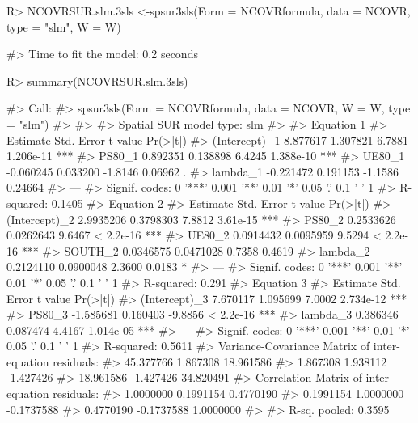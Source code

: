 \documentclass[article]{jss}
\begin{document}
\begin{CodeChunk}

\begin{CodeInput}
R> NCOVRSUR.slm.3sls <-spsur3sls(Form = NCOVRformula, data = NCOVR, type = "slm", W = W)
\end{CodeInput}

\begin{CodeOutput}
#> Time to fit the model:  0.2  seconds
\end{CodeOutput}

\begin{CodeInput}
R> summary(NCOVRSUR.slm.3sls)
\end{CodeInput}

\begin{CodeOutput}
#> Call:
#> spsur3sls(Form = NCOVRformula, data = NCOVR, W = W, type = "slm")
#> 
#>  
#> Spatial SUR model type:  slm 
#> 
#> Equation  1 
#>                Estimate Std. Error t value  Pr(>|t|)    
#> (Intercept)_1  8.877617   1.307821  6.7881 1.206e-11 ***
#> PS80_1         0.892351   0.138898  6.4245 1.388e-10 ***
#> UE80_1        -0.060245   0.033200 -1.8146   0.06962 .  
#> lambda_1      -0.221472   0.191153 -1.1586   0.24664    
#> ---
#> Signif. codes:  0 '***' 0.001 '**' 0.01 '*' 0.05 '.' 0.1 ' ' 1
#> R-squared: 0.1405 
#>   Equation  2 
#>                Estimate Std. Error t value  Pr(>|t|)    
#> (Intercept)_2 2.9935206  0.3798303  7.8812  3.61e-15 ***
#> PS80_2        0.2533626  0.0262643  9.6467 < 2.2e-16 ***
#> UE80_2        0.0914432  0.0095959  9.5294 < 2.2e-16 ***
#> SOUTH_2       0.0346575  0.0471028  0.7358    0.4619    
#> lambda_2      0.2124110  0.0900048  2.3600    0.0183 *  
#> ---
#> Signif. codes:  0 '***' 0.001 '**' 0.01 '*' 0.05 '.' 0.1 ' ' 1
#> R-squared: 0.291 
#>   Equation  3 
#>                Estimate Std. Error t value  Pr(>|t|)    
#> (Intercept)_3  7.670117   1.095699  7.0002 2.734e-12 ***
#> PS80_3        -1.585681   0.160403 -9.8856 < 2.2e-16 ***
#> lambda_3       0.386346   0.087474  4.4167 1.014e-05 ***
#> ---
#> Signif. codes:  0 '***' 0.001 '**' 0.01 '*' 0.05 '.' 0.1 ' ' 1
#> R-squared: 0.5611 
#>   Variance-Covariance Matrix of inter-equation residuals:                              
#>  45.377766  1.867308 18.961586
#>   1.867308  1.938112 -1.427426
#>  18.961586 -1.427426 34.820491
#> Correlation Matrix of inter-equation residuals:                                
#>  1.0000000  0.1991154  0.4770190
#>  0.1991154  1.0000000 -0.1737588
#>  0.4770190 -0.1737588  1.0000000
#> 
#>  R-sq. pooled: 0.3595
\end{CodeOutput}
\end{CodeChunk}
\end{document}
